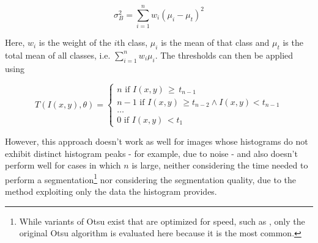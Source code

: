 \[ \sigma_B^2 = \sum \limits_{i=1}^{n} w_i (\mu_i - \mu_t)^2 \]

\noindent Here, $w_i$ is the weight of the $i$th class, $\mu_i$ is the mean of that class and $\mu_t$ is the total mean of all classes, i.e. $\sum_{i=1}^{n} w_i \mu_i$. The thresholds can then be applied using

\[ T(I(x, y), \theta) =  \begin{cases}
				n \text{ if } I(x, y) \, \geq \, t_{n-1} \\
				n-1 \text { if } I(x, y) \, \geq t_{n-2} \land I(x, y) < t_{n-1}\\
				\dots\\
			           0 \text{ if } I(x, y) \, < t_1
			     \end{cases}
\]

\noindent However, this approach doesn't work as well for images whose histograms do not exhibit distinct histogram peaks - for example, due to noise - and also doesn't perform well for cases in which $n$ is large, neither considering the time needed to perform a segmentation\footnote{While variants of Otsu exist that are optimized for speed, such as \cite{otsu_fast}, only the original Otsu algorithm is evaluated here because it is the most common.} nor considering the segmentation quality, due to the method exploiting only the data the histogram provides.




